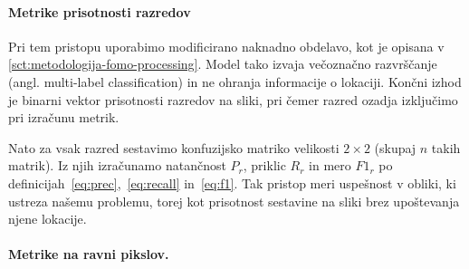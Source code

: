 \documentclass[a4paper,twoside,openright,12pt,slovene]{book}
\begin{document}
            \paragraph{Metrike prisotnosti razredov}
            
            
            Pri tem pristopu uporabimo modificirano naknadno obdelavo, kot je opisana v \ref{sct:metodologija-fomo-processing}. Model tako izvaja večoznačno razvrščanje (angl. multi-label classification) in ne ohranja informacije o lokaciji.
            Končni izhod je binarni vektor prisotnosti razredov na sliki, pri čemer razred ozadja izključimo pri izračunu metrik.

            Nato za vsak razred sestavimo konfuzijsko matriko velikosti
            \(2\times 2\) (skupaj \(n\) takih matrik). Iz njih izračunamo
            natančnost $P_r$, priklic $R_r$ in mero $F1_r$ po
            definicijah~\ref{eq:prec},~\ref{eq:recall}
            in~\ref{eq:f1}.
            Tak pristop meri uspešnost v obliki, ki ustreza našemu problemu,
            torej kot prisotnost sestavine na sliki brez upoštevanja njene
            lokacije.
            


            \paragraph{Metrike na ravni pikslov.} \label{sct:eir-metrike-pixel}
\end{document}
